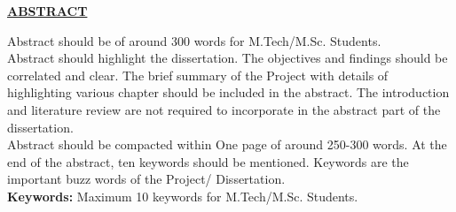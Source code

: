 {\centering
	\par
	\large \textbf{\underline{ABSTRACT}} \par
}\vspace{0.7cm}

\noindent Abstract should be of around 300 words for M.Tech/M.Sc. Students.\\
	
\noindent Abstract should highlight the dissertation. The objectives and findings should be correlated and clear. The brief summary of the Project with details of highlighting various chapter should be included in the abstract. The introduction and literature review are not required to incorporate in the abstract part of the dissertation.\\

\noindent Abstract should be compacted within One page of around 250-300 words. At the end of the abstract, ten keywords should be mentioned. Keywords are the important buzz words of the Project/ Dissertation.\\


\noindent\textbf{Keywords:} Maximum 10 keywords for M.Tech/M.Sc. Students.